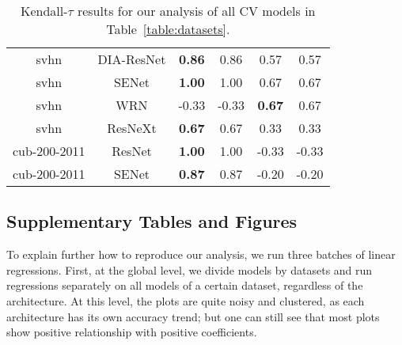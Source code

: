 \begin{table}[t]
\begin{center}
\begin{tabular}{|c|c|c|c|c|c|}
 svhn & DIA-ResNet  & \textbf{0.86} &  0.86 & 0.57 & 0.57 \\
 svhn & SENet  & \textbf{1.00} &  1.00 & 0.67 & 0.67 \\
 svhn & WRN  & -0.33 &  -0.33 & \textbf{0.67} & 0.67 \\
 svhn & ResNeXt  & \textbf{0.67} &  0.67 & 0.33 & 0.33 \\
\hline
 cub-200-2011 & ResNet  & \textbf{1.00} &  1.00 & -0.33 & -0.33 \\
 cub-200-2011 & SENet  & \textbf{0.87} &  0.87 & -0.20 & -0.20 \\
\hline
\end{tabular}
\end{center}
\vspace{-5mm}
\caption{Kendall-$\tau$ results for our analysis of all CV models in Table~\ref{table:datasets}. }
\label{table:KTresults}
\end{table}


\subsection{Supplementary Tables and Figures}



To explain further how to reproduce our analysis, we run three batches of linear regressions. 
First, at the global level, we divide models by datasets and run regressions separately on all models of a certain dataset, regardless of the architecture. 
At this level, the plots are quite noisy and clustered, as each architecture has its own accuracy trend; but one can
 still see that most plots show positive relationship with positive coefficients. 

